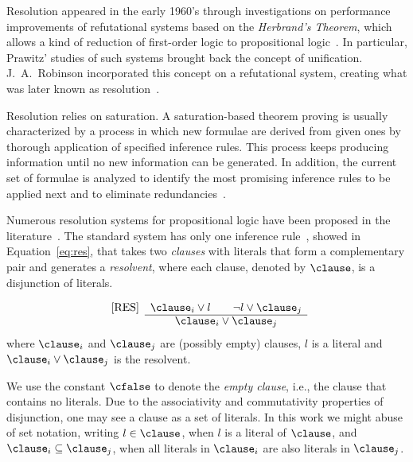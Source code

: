 Resolution appeared in the early 1960's through investigations on performance
improvements of refutational systems based on the \emph{Herbrand's Theorem}, which
allows a kind of reduction of first-order logic to propositional
logic~\cite{casanova}. In particular, Prawitz' studies of such systems brought
back the concept of unification. J.\ A.\ Robinson incorporated this concept on a
refutational system, creating what was later known as
resolution~\cite{Robinson65}. 

Resolution relies on saturation. A saturation-based theorem proving is usually
characterized by a process in which new formulae are derived from given ones by
thorough application of specified inference rules. This process keeps producing
information until no new information can be generated. In addition, the current
set of formulae is analyzed to identify the most promising inference rules to be
applied next and to eliminate redundancies~\cite{bachmair2001resolution}.

Numerous resolution systems for propositional logic have been proposed in the
literature~\cite{bachmair2001resolution}. The standard system has only one
inference rule~\cite{Robinson65}, showed in Equation~\ref{eq:res}, that takes
two \emph{clauses} with literals that form a complementary pair and generates a
\emph{resolvent}, where each clause, denoted by $\clause$, is a disjunction of
literals. 

\begin{equation}
\label{eq:res}
 \begin{array}{lc}
     \mbox{[RES]} & \clause_i \lor l \qquad \neg l \lor \clause_j\\  \cline{2-2}
     & \clause_i \lor \clause_j
\end{array}
\end{equation}
where $\clause_i$ and $\clause_j$ are (possibly empty) clauses, $l$ is a literal
and $\clause_i \lor \clause_j$ is the resolvent.

We use the constant $\cfalse$ to denote the \emph{empty clause},
i.e., the clause that contains no literals. Due to the associativity and
commutativity properties of disjunction, one may see a clause as a set of
literals. In this work we might abuse of set notation, writing $l \in \clause$,
when $l$ is a literal of $\clause$, and $\clause_i \subseteq \clause_j$, when
all literals in $\clause_i$ are also literals in $\clause_j$.

